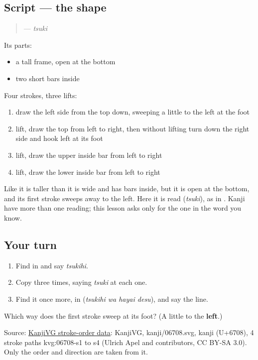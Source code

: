 \subsection*{Script — the shape}
\begin{quote}
\textbf{} — \emph{tsuki}
\end{quote}

Its parts:

\begin{itemize}
\raggedright
  \item a tall frame, open at the bottom
  \item two short bars inside
\end{itemize}

Four strokes, three lifts:

\begin{enumerate}
\raggedright
  \item draw the left side from the top down, sweeping a little to the left at the foot
  \item lift, draw the top from left to right, then without lifting turn down the right side and hook left at its foot
  \item lift, draw the upper inside bar from left to right
  \item lift, draw the lower inside bar from left to right
\end{enumerate}

Like \textbf{} it is taller than it is wide and has bars inside, but it is open at the bottom, and its first stroke sweeps away to the left. Here it is read \textbf{} (\emph{tsuki}), as in \textbf{}. Kanji have more than one reading; this lesson asks only for the one in the word you know.

\subsection*{Your turn}
\begin{enumerate}
\raggedright
  \item Find \textbf{} in \textbf{} and say \emph{tsukihi}.
  \item Copy \textbf{} three times, saying \emph{tsuki} at each one.
  \item Find it once more, in \textbf{ } (\emph{tsukihi wa hayai desu}), and say the line.
\end{enumerate}

\begin{tcolorbox}[breakable,colback=teal!4,colframe=teal!35!black,title={Before you move on}]
Which way does the first stroke sweep at its foot? (A little to the \textbf{left}.)

Source: \href{https://github.com/KanjiVG/kanjivg/blob/master/kanji/06708.svg}{KanjiVG stroke-order data}: KanjiVG, kanji/06708.svg, kanji  (U+6708), 4 stroke paths kvg:06708-s1 to s4 (Ulrich Apel and contributors, CC BY-SA 3.0). Only the order and direction are taken from it.
\end{tcolorbox}
